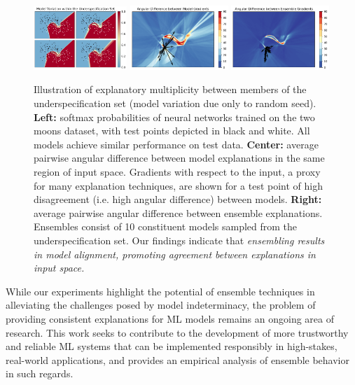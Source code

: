 \begin{figure}[t]
    \centering
    \includegraphics[width=0.3135\textwidth]{figures/toy_underspec.png}
    \includegraphics[width=0.33\textwidth]{figures/toy_single.png}
    \includegraphics[width=0.33\textwidth]{figures/toy_ensemble.png}
    \caption{\small Illustration of explanatory multiplicity between members of the underspecification set (model variation due only to random seed). \textbf{Left:} softmax probabilities of neural networks trained on the two moons dataset, with test points depicted in black and white. All models achieve similar performance on test data. \textbf{Center:} average pairwise angular difference between model explanations in the same region of input space. Gradients with respect to the input, a proxy for many explanation techniques, are shown for a test point of high disagreement (i.e. high angular difference) between models. \textbf{Right:} average pairwise angular difference between ensemble explanations. Ensembles consist of 10 constituent models sampled from the underspecification set. Our findings indicate that \textit{ensembling results in model alignment, promoting agreement between explanations in input space.}}
    \label{fig:toy_example}
\end{figure}%

While our experiments highlight the potential of ensemble techniques in alleviating the challenges posed by model indeterminacy, the problem of providing consistent explanations for ML models remains an ongoing area of research. This work seeks to contribute to the development of more  trustworthy and reliable ML systems that can be implemented responsibly in high-stakes, real-world applications, and provides an empirical analysis of ensemble behavior in such regards.

